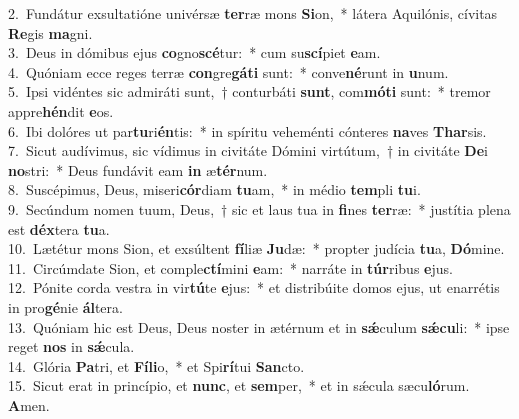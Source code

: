 {2.~}Fundátur exsultatióne univérsæ \textbf{ter}ræ mons \textbf{Si}on,~* látera Aquilónis, cívitas \textbf{Re}gis \textbf{ma}gni.\\
{3.~}Deus in dómibus ejus \textbf{co}gno\textbf{scé}tur:~* cum su\textbf{scí}piet \textbf{e}am.\\
{4.~}Quóniam ecce reges terræ \textbf{con}gre\textbf{gá}\textbf{ti} sunt:~* conve\textbf{né}runt in \textbf{u}num.\\
{5.~}Ipsi vidéntes sic admiráti sunt,~† conturbáti \textbf{sunt}, com\textbf{mó}\textbf{ti} sunt:~* tremor appre\textbf{hén}dit \textbf{e}os.\\
{6.~}Ibi dolóres ut par\textbf{tu}ri\textbf{én}tis:~* in spíritu veheménti cónteres \textbf{na}ves \textbf{Thar}sis.\\
{7.~}Sicut audívimus, sic vídimus in civitáte Dómini virtútum,~† in civitáte \textbf{De}i \textbf{no}stri:~* Deus fundávit eam \textbf{in} æ\textbf{tér}num.\\
{8.~}Suscépimus, Deus, miseri\textbf{cór}diam \textbf{tu}am,~* in médio \textbf{tem}pli \textbf{tu}i.\\
{9.~}Secúndum nomen tuum, Deus,~† sic et laus tua in \textbf{fi}nes \textbf{ter}ræ:~* justítia plena est \textbf{déx}tera \textbf{tu}a.\\
{10.~}Lætétur mons Sion, et exsúltent \textbf{fí}liæ \textbf{Ju}dæ:~* propter judícia \textbf{tu}a, \textbf{Dó}mine.\\
{11.~}Circúmdate Sion, et comple\textbf{ctí}mini \textbf{e}am:~* narráte in \textbf{túr}ribus \textbf{e}jus.\\
{12.~}Pónite corda vestra in vir\textbf{tú}te \textbf{e}jus:~* et distribúite domos ejus, ut enarrétis in pro\textbf{gé}nie \textbf{ál}tera.\\
{13.~}Quóniam hic est Deus, Deus noster in ætérnum et in \textbf{sǽ}culum \textbf{sǽ}\textbf{cu}li:~* ipse reget \textbf{nos} in \textbf{sǽ}cula.\\
{14.~}Glória \textbf{Pa}tri, et \textbf{Fí}\textbf{li}o,~* et Spi\textbf{rí}tui \textbf{San}cto.\\
{15.~}Sicut erat in princípio, et \textbf{nunc}, et \textbf{sem}per,~* et in sǽcula sæcu\textbf{ló}rum. \textbf{A}men.\\
